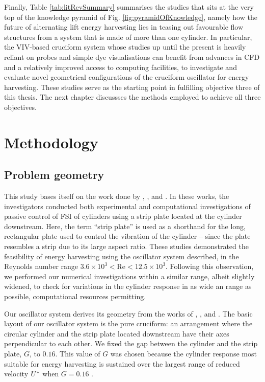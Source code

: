 \documentclass[oneside]{utmthesis}
\begin{document}
Finally, Table \ref{tab:litRevSummary} summarises the studies that sits at the very top of the knowledge pyramid of Fig. \ref{fig:pyramidOfKnowledge}, namely how the future of alternating lift energy harvesting lies in teasing out favourable flow structures from a system that is made of more than one cylinder. In particular, the VIV-based cruciform system whose studies up until the present is heavily reliant on probes and simple dye visualisations can benefit from advances in CFD and a relatively improved access to computing facilities, to investigate and evaluate novel geometrical configurations of the cruciform oscillator for energy harvesting. These studies serve as the starting point in fulfilling objective three of this thesis. The next chapter discussses the methods employed to achieve all three objectives.

\chapter{Methodology} \label{chap:method}
\section{Problem geometry} \label{sec:probGeo}
This study bases itself on the work done by \citet{Maruai2017}, \citet{Maruai2018}, and \citet{Koide2013}. In these works, the investigators conducted both experimental and computational investigations of passive control of FSI of cylinders using a strip plate located at the cylinder downstream. Here, the term ``strip plate'' is used as a shorthand for the long, rectangular plate used to control the vibration of the cylinder -- since the plate resembles a strip due to its large aspect ratio. These studies demonstrated the feasibility of energy harvesting using the oscillator system described, in the Reynolds number range $3.6\times10^{3}<\text{Re}<12.5\times10^{3}$. Following this observation, we performed our numerical investigations within a similar \re{} range, albeit slightly widened, to check for variations in the cylinder response in as wide an \re{} range as possible, computational resources permitting.

Our oscillator system derives its geometry from the works of \citet{Nguyen2012}, \citet{Koide2013}, and \citet{Koide2017}. The basic layout of our oscillator system is the pure cruciform: an arrangement where the circular cylinder and the strip plate located downstream have their axes perpendicular to each other. We fixed the gap between the cylinder and the strip plate, $G$, to $0.16$. This value of $G$ was chosen because the cylinder response most suitable for energy harvesting is sustained over the largest range of reduced velocity $U^{*}$ when $G = 0.16$ \citep{Koide2013}.
\end{document}
